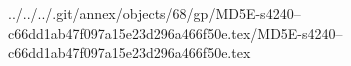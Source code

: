 ../../../.git/annex/objects/68/gp/MD5E-s4240--c66dd1ab47f097a15e23d296a466f50e.tex/MD5E-s4240--c66dd1ab47f097a15e23d296a466f50e.tex